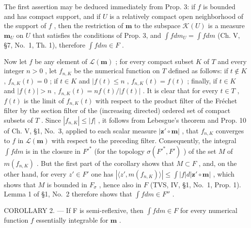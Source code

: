 The first assertion may be deduced immediately from Prop. 3: if \(f\) is bounded and has compact support, and if \(U\) is a relatively compact open neighborhood of the support of \(f\) , then the restriction of \(\mathbf{m}\) to the subspace \(\mathcal{K}(U)\) is a measure \(\mathbf{m}_U\) on \(U\) that satisfies the conditions of Prop. 3, and \(\int f dm_U = \int f dm\) (Ch. V, §7, No.~1, Th. 1), therefore \(\int f dm \in F\) .

Now let \(f\) be any element of \(\mathcal{L}(\mathbf{m})\) ; for every compact subset \(K\) of \(T\) and every integer \(n > 0\) , let \(f_{n,K}\) be the numerical function on \(T\) defined as follows: if \(t \notin K\) , \(f_{n,K}(t) = 0\) ; if \(t \in K\) and \(|f(t) \leqslant n\) , \(f_{n,K}(t) = f(t)\) ; finally, if \(t \in K\) and \(|f(t)| > n\) , \(f_{n,K}(t) = nf(t)/|f(t)|\) . It is clear that for every \(t \in T\) , \(f(t)\) is the limit of \(f_{n,K}(t)\) with respect to the product filter of the Fréchet filter by the section filter of the (increasing directed) ordered set of compact subsets of \(T\) . Since \(|f_{n,K}| \leqslant |f|\) , it follows from Lebesgue's theorem and Prop. 10 of Ch. V, §1, No.~3, applied to each scalar measure \(|\mathbf{z}' \circ \mathbf{m}|\) , that \(f_{n,K}\) converges to \(f\) in \(\mathcal{L}(\mathbf{m})\) with respect to the preceding filter. Consequently, the integral \(\int f dm\) is in the closure in \(F'^*\) (for the topology \(\sigma(F'^*, F')\) ) of the set \(M\) of \(m(f_{n,K})\) . But the first part of the corollary shows that \(M \subset F\) , and, on the other hand, for every \(z' \in F'\) one has \(|\langle z', m(f_{n,K})\rangle| \leqslant \int |f| d|\mathbf{z}' \circ \mathbf{m}|\) , which shows that \(M\) is bounded in \(F_\sigma\) , hence also in \(F\) (TVS, IV, §1, No.~1, Prop. 1). Lemma 1 of §1, No.~2 therefore shows that \(\int f dm \in F''\) .

COROLLARY 2. --- If F is semi-reflexive, then \(\int f dm \in F\) for every numerical function \(f\) essentially integrable for \(\mathbf{m}\) .

